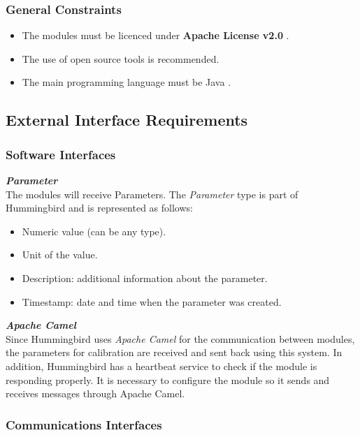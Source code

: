 \subsubsection{General Constraints}

\begin{itemize}
\item The modules must be licenced under \textbf{Apache License v2.0} \cite{AL20}.
\item The use of open source tools is recommended.
\item The main programming language must be Java \cite{Java}.
\end{itemize}

\subsection{External Interface Requirements}

\subsubsection{Software Interfaces}

\textbf{\emph{Parameter}}\\
The modules will receive Parameters. The \emph{Parameter} type is part of Hummingbird and is represented as follows:

\begin{itemize}
\item Numeric value (can be any type).
\item Unit of the value.
\item Description: additional information about the parameter.
\item Timestamp: date and time when the parameter was created.

\end{itemize}

\vspace*{1\baselineskip}
\textbf{\emph{Apache Camel}} \citep{Camel}\\
Since Hummingbird uses \emph{Apache Camel} for the communication between modules, the parameters for calibration are received and sent back using this system. In addition, Hummingbird has a heartbeat service to check if the module is responding properly. It is necessary to configure the module so it sends and receives messages through Apache Camel.


\subsubsection{Communications Interfaces}

